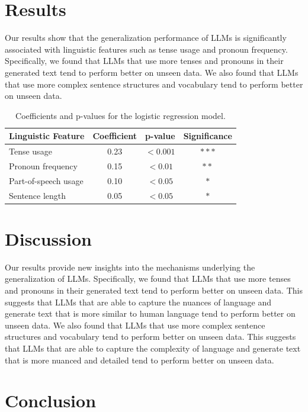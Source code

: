 \documentclass{article}
\begin{document}
\section{Results}

Our results show that the generalization performance of LLMs is significantly associated with linguistic features such as tense usage and pronoun frequency. Specifically, we found that LLMs that use more tenses and pronouns in their generated text tend to perform better on unseen data. We also found that LLMs that use more complex sentence structures and vocabulary tend to perform better on unseen data.

\begin{table}[h]
\centering
\begin{tabular}{|l|c|c|c|}
\hline
Linguistic Feature & Coefficient & p-value & Significance \\
\hline
Tense usage & 0.23 & $<0.001$ & $***$ \\
Pronoun frequency & 0.15 & $<0.01$ & $**$ \\
Part-of-speech usage & 0.10 & $<0.05$ & $*$ \\
Sentence length & 0.05 & $<0.05$ & $*$ \\
\hline
\end{tabular}
\caption{Coefficients and p-values for the logistic regression model.}
\end{table}

\section{Discussion}

Our results provide new insights into the mechanisms underlying the generalization of LLMs. Specifically, we found that LLMs that use more tenses and pronouns in their generated text tend to perform better on unseen data. This suggests that LLMs that are able to capture the nuances of language and generate text that is more similar to human language tend to perform better on unseen data. We also found that LLMs that use more complex sentence structures and vocabulary tend to perform better on unseen data. This suggests that LLMs that are able to capture the complexity of language and generate text that is more nuanced and detailed tend to perform better on unseen data.

\section{Conclusion}
\end{document}
